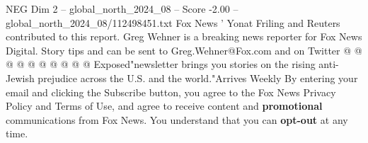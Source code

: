 \begin{textsample}{NEG Dim 2 – global\_north\_2024\_08 – Score -2.00 – global\_north\_2024\_08/112498451.txt}
Fox News ' Yonat Friling and Reuters contributed to this report.
Greg Wehner is a breaking news reporter for Fox News Digital.
Story tips and can be sent to Greg.Wehner@Fox.com and on Twitter @ @ @ @ @ @ @ @ @ @ Exposed"newsletter brings you stories on the rising anti-Jewish prejudice across the U.S. and the world."Arrives Weekly By entering your email and clicking the Subscribe button, you agree to the Fox News Privacy Policy and Terms of Use, and agree to receive content and \textbf{promotional} communications from Fox News.
You understand that you can \textbf{opt-out} at any time.

\end{textsample}
